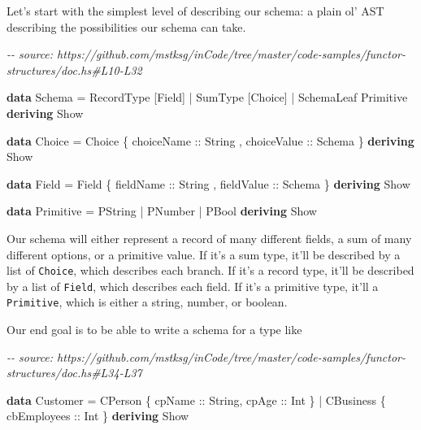 \documentclass[]{article}
\newenvironment{Shaded}{}{}
\newcommand{\CommentTok}[1]{\textcolor[rgb]{0.38,0.63,0.69}{\textit{#1}}}
\newcommand{\DataTypeTok}[1]{\textcolor[rgb]{0.56,0.13,0.00}{#1}}
\newcommand{\KeywordTok}[1]{\textcolor[rgb]{0.00,0.44,0.13}{\textbf{#1}}}
\newcommand{\NormalTok}[1]{#1}
\newcommand{\OperatorTok}[1]{\textcolor[rgb]{0.40,0.40,0.40}{#1}}
\newcommand{\OtherTok}[1]{\textcolor[rgb]{0.00,0.44,0.13}{#1}}
\begin{document}
Let's start with the simplest level of describing our schema: a plain ol' AST
describing the possibilities our schema can take.

\begin{Shaded}
\begin{Highlighting}[]
\CommentTok{{-}{-} source: https://github.com/mstksg/inCode/tree/master/code{-}samples/functor{-}structures/doc.hs\#L10{-}L32}

\KeywordTok{data} \DataTypeTok{Schema} \OtherTok{=}
      \DataTypeTok{RecordType}\NormalTok{  [}\DataTypeTok{Field}\NormalTok{]}
    \OperatorTok{|} \DataTypeTok{SumType}\NormalTok{     [}\DataTypeTok{Choice}\NormalTok{]}
    \OperatorTok{|} \DataTypeTok{SchemaLeaf}  \DataTypeTok{Primitive}
  \KeywordTok{deriving} \DataTypeTok{Show}

\KeywordTok{data} \DataTypeTok{Choice} \OtherTok{=} \DataTypeTok{Choice}
\NormalTok{    \{}\OtherTok{ choiceName  ::} \DataTypeTok{String}
\NormalTok{    ,}\OtherTok{ choiceValue ::} \DataTypeTok{Schema}
\NormalTok{    \}}
  \KeywordTok{deriving} \DataTypeTok{Show}

\KeywordTok{data} \DataTypeTok{Field} \OtherTok{=} \DataTypeTok{Field}
\NormalTok{    \{}\OtherTok{ fieldName  ::} \DataTypeTok{String}
\NormalTok{    ,}\OtherTok{ fieldValue ::} \DataTypeTok{Schema}
\NormalTok{    \}}
  \KeywordTok{deriving} \DataTypeTok{Show}

\KeywordTok{data} \DataTypeTok{Primitive} \OtherTok{=}
      \DataTypeTok{PString}
    \OperatorTok{|} \DataTypeTok{PNumber}
    \OperatorTok{|} \DataTypeTok{PBool}
  \KeywordTok{deriving} \DataTypeTok{Show}
\end{Highlighting}
\end{Shaded}

Our schema will either represent a record of many different fields, a sum of
many different options, or a primitive value. If it's a sum type, it'll be
described by a list of \texttt{Choice}, which describes each branch. If it's a
record type, it'll be described by a list of \texttt{Field}, which describes
each field. If it's a primitive type, it'll a \texttt{Primitive}, which is
either a string, number, or boolean.

Our end goal is to be able to write a schema for a type like

\begin{Shaded}
\begin{Highlighting}[]
\CommentTok{{-}{-} source: https://github.com/mstksg/inCode/tree/master/code{-}samples/functor{-}structures/doc.hs\#L34{-}L37}

\KeywordTok{data} \DataTypeTok{Customer} \OtherTok{=}
      \DataTypeTok{CPerson}\NormalTok{   \{}\OtherTok{ cpName ::} \DataTypeTok{String}\NormalTok{,}\OtherTok{ cpAge ::} \DataTypeTok{Int}\NormalTok{ \}}
    \OperatorTok{|} \DataTypeTok{CBusiness}\NormalTok{ \{}\OtherTok{ cbEmployees ::} \DataTypeTok{Int}\NormalTok{ \}}
  \KeywordTok{deriving} \DataTypeTok{Show}
\end{Highlighting}
\end{Shaded}
\end{document}
